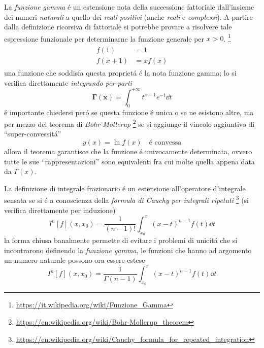 

\usepackage[italian]{babel}





\begin{multicols}{3}
  La \textit{funzione gamma} \'e un estensione nota della successione fattoriale dall'insieme dei numeri
  \textit{naturali} a quello dei \textit{reali positivi} (anche \textit{reali} e \textit{complessi}).
  A partire dalla definizione ricorsiva di fattoriale si potrebbe provare a risolvere tale espressione
  funzionale per determinarne la funzione generale per $x > 0$.
  \footnote{\url{https://it.wikipedia.org/wiki/Funzione_Gamma}}
  \begin{align}
    \label{eq:gamma-implicit}
    \begin{split}
      f(1) &= 1 \\
      f(x+1) &= xf(x)
    \end{split}
  \end{align}
  una funzione che soddisfa questa propriet\'a \'e la nota funzione gamma; lo si verifica direttamente
  \textit{integrando per parti}
  \begin{equation}
    \label{eq:gamma-function}
    \boldsymbol{\Gamma(x)} = \int_0^{+\infty}t^{x-1}e^{-t} \dd{t}
  \end{equation}
  \'e importante chiedersi per\'o se questa funzione \'e unica o se ne esistono altre, ma per mezzo del
  teorema di \textit{Bohr-Mollerup}
  \footnote{\url{https://en.wikipedia.org/wiki/Bohr-Mollerup_theorem}}
  se si aggiunge il vincolo aggiuntivo di ``super-convessit\'a''
  \begin{equation}
    \label{eq:super-convexity}
    y(x) = \ln f(x) \quad \text{\'e convessa}
  \end{equation}
  allora il teorema garantisce che la funzione \'e univocamente determinata, ovvero tutte le sue
  ``rappresentazioni'' sono equivalenti fra cui molte quella appena data da $\Gamma(x)$.

  La definizione di integrale frazionario \'e un estensione all'operatore d'integrale sensata se
  si \'e a conoscienza della \textit{formula di Cauchy per integrali ripetuti}
  \footnote{\url{https://en.wikipedia.org/wiki/Cauchy_formula_for_repeated_integration}}
  (si verifica direttamente per induzione)
  \begin{equation}
    \label{eq:cauchy-formula}
    I^n[f](x, x_0) = \frac{1}{(n-1)!} \int_{x_0}^x (x-t)^{n-1}f(t)\dd{t}
  \end{equation}
  la forma chiusa banalmente permette di evitare i problemi di unicit\'a che si incontrarono definendo
  la \textit{funzione gamma}, le funzioni che hanno ad argomento un numero naturale possono ora essere
  estese
  \begin{equation}
    \label{eq:cauchy-formula}
    I^n[f](x, x_0) = \frac{1}{\Gamma(n-1)} \int_{x_0}^x (x-t)^{n-1}f(t)\dd{t}
  \end{equation}


\end{multicols}
